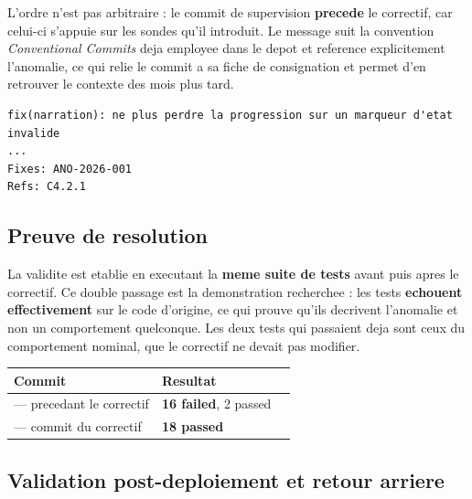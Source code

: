 L'ordre n'est pas arbitraire : le commit de supervision \textbf{precede} le correctif, car
celui-ci s'appuie sur les sondes qu'il introduit. Le message suit la convention \emph{Conventional
Commits} deja employee dans le depot et reference explicitement l'anomalie, ce qui relie le commit
a sa fiche de consignation et permet d'en retrouver le contexte des mois plus tard.

\begin{lstlisting}[style=sortie]
fix(narration): ne plus perdre la progression sur un marqueur d'etat invalide
...
Fixes: ANO-2026-001
Refs: C4.2.1
\end{lstlisting}

\subsection{Preuve de resolution}

La validite est etablie en executant la \textbf{meme suite de tests} avant puis apres le correctif.
Ce double passage est la demonstration recherchee : les tests \textbf{echouent effectivement} sur le
code d'origine, ce qui prouve qu'ils decrivent l'anomalie et non un comportement quelconque. Les
deux tests qui passaient deja sont ceux du comportement nominal, que le correctif ne devait pas
modifier.

\footnotesize
\begin{tabularx}{0.92\linewidth}{@{}L{5.4cm} L{4.0cm} X@{}}
\toprule
\textbf{Commit} & \textbf{Resultat} & \\
\midrule
{} --- precedant le correctif & \textcolor{RougeKo}{\textbf{16 failed}}, 2 passed & \\
 --- commit du correctif & \textcolor{VertOk}{\textbf{18 passed}} & \\
\bottomrule
\end{tabularx}
\normalsize

\subsection{Validation post-deploiement et retour arriere}


